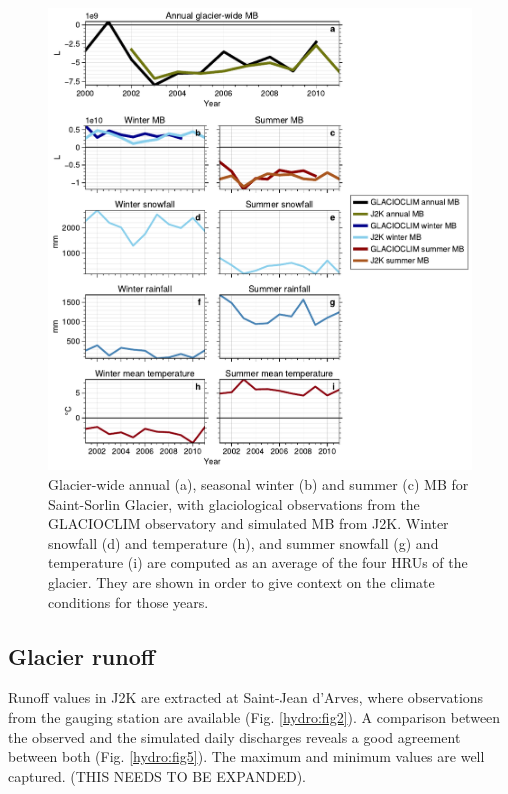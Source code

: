 \begin{figure}[h]
\centering
\includegraphics[width=15cm]{Figures/hydro/Figure_4.pdf}
\caption{Glacier-wide annual (a), seasonal winter (b) and summer (c) MB for Saint-Sorlin Glacier, with glaciological observations from the GLACIOCLIM observatory and simulated MB from J2K. Winter snowfall (d) and temperature (h), and summer snowfall (g) and temperature (i) are computed as an average of the four HRUs of the glacier. They are shown in order to give context on the climate conditions for those years.} 
\label{hydro:fig4}
\end{figure}


\subsection{Glacier runoff}

Runoff values in J2K are extracted at Saint-Jean d'Arves, where observations from the gauging station are available (Fig. \ref{hydro:fig2}). A comparison between the observed and the  simulated daily discharges reveals a good agreement between both (Fig. \ref{hydro:fig5}). The maximum and minimum values are well captured. (THIS NEEDS TO BE EXPANDED).


